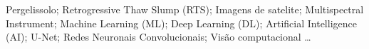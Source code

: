 \begin{keywords}
  Pergelissolo; Retrogressive Thaw Slump (RTS); Imagens de satelite;  Multispectral Instrument; Machine Learning (ML); Deep Learning (DL); Artificial Intelligence (AI); U-Net; Redes Neuronais Convolucionais; Visão computacional \ldots
\end{keywords}

%
%
